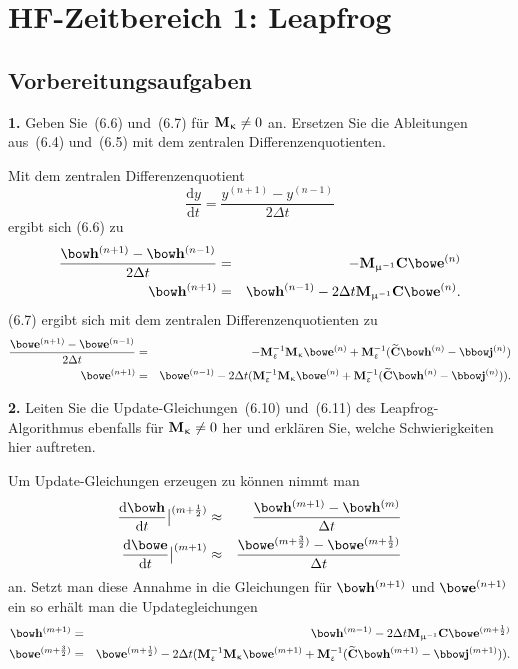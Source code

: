 \documentclass[Protokollheft.tex]{subfiles}
\begin{document}
\chapter{HF-Zeitbereich 1: Leapfrog}
\section{Vorbereitungsaufgaben}



\begin{framed}
	\noindent \textbf{1.} Geben Sie~(6.6) und~(6.7) für $\mathbf{M}_{\upkappa} \neq 0$ an. Ersetzen Sie die Ableitungen aus~(6.4) und~(6.5) mit dem zentralen Differenzenquotienten.\label{exer:updateSchemeNoConductor}
\end{framed}

Mit dem zentralen Differenzenquotient
\begin{equation*}
	\frac{\text{d}y}{\text{d}t}=\frac{y^{(n+1)}-y^{(n-1)}}{2\Delta t}
\end{equation*}
ergibt sich (6.6) zu
\begin{eqnarray*}
	\frac{\hfit^{(n+1)}-\hfit^{(n-1)}}{2\Delta t}&=&-\Mmui\curlfit\efit^{(n)}\\
	\hfit^{(n+1)}&=&\hfit^{(n-1)}-2\Delta t\Mmui\curlfit\efit^{(n)}.
\end{eqnarray*}
(6.7) ergibt sich mit dem zentralen Differenzenquotienten zu
\begin{eqnarray*}
	\frac{\efit^{(n+1)}-\efit^{(n-1)}}{2\Delta t}&=&-\Meps^{-1}\Mkap\efit^{(n)}+\Meps^{-1}(\curldfit\hfit^{(n)}-\jfit^{(n)})\\
	\efit^{(n+1)}&=&\efit^{(n-1)}-2\Delta t(\Meps^{-1}\Mkap\efit^{(n)}+\Meps^{-1}(\curldfit\hfit^{(n)}-\jfit^{(n)})).
\end{eqnarray*}

\begin{framed}
	\noindent \textbf{2.} Leiten Sie die Update-Gleichungen~(6.10) und~(6.11) des Leapfrog-Algorithmus ebenfalls für ${\mathbf{M}_{\upkappa} \neq 0}$ her und erklären Sie, welche Schwierigkeiten hier auftreten.\label{exer:updateSchemeWithConductor}
\end{framed}

Um Update-Gleichungen erzeugen zu können nimmt man
\begin{eqnarray}
	\frac{\text{d}\hfit}{\text{d}t}\big |^{(m+\frac{1}{2})}&\approx&	\frac{\hfit^{(m+1)}-\hfit^{(m)}}{\Delta t}\\
	\frac{\text{d}\efit}{\text{d}t}\big |^{(m+1)}&\approx&	\frac{\efit^{(m+\frac{3}{2})}-\efit^{(m+\frac{1}{2})}}{\Delta t}	
\end{eqnarray}
an. Setzt man diese Annahme in die Gleichungen für $\hfit^{(n+1)}$ und $\efit^{(n+1)}$ ein so erhält man die Updategleichungen
\begin{eqnarray*}
	\hfit^{(m+1)}&=&\hfit^{(m-1)}-2\Delta t\Mmui\curlfit\efit^{(m+\frac{1}{2})}\\
	\efit^{(m+\frac{3}{2})}&=&\efit^{(m+\frac{1}{2})}-2\Delta t(\Meps^{-1}\Mkap\efit^{(m+1)}+\Meps^{-1}(\curldfit\hfit^{(m+1)}-\jfit^{(m+1)})).
\end{eqnarray*}
\end{document}

